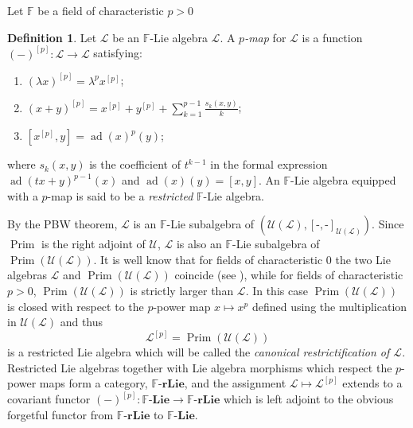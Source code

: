 \documentclass{amsart}
\theoremstyle{plain}
\theoremstyle{definition}
\newtheorem{defn}{Definition}
\numberwithin{theorem}{section}
\numberwithin{equation}{section}
\newcommand{\LL}{\mathscr{L}}
\newcommand{\Univ}{\mathscr{U}}
\newcommand{\Prim}{\operatorname{Prim}}
\newcommand{\ad}{\operatorname{ad}}
\newcommand{\catlie}{\mathbf{Lie}}
\newcommand{\catReslie}{\mathbf{rLie}}
\newcommand{\FF}{\mathbb{F}}
\begin{document}
Let $\FF$ be a field of characteristic $p > 0$
\begin{defn}\label{def:restricted.lie.alg}
    Let $\LL$ be an $\FF$-Lie algebra $\LL$. A \emph{$p$-map} for $\LL$ is a function $(-)^{[p]} : \LL \to \LL$ satisfying:
    \begin{enumerate}
        \item[($\rm rL_1$)] $(\lambda x)^{[p]} = \lambda^p x^{[p]}$;
        \item[($\rm rL_2$)] $(x + y)^{[p]} = x^{[p]} + y^{[p]} + \sum_{k=1}^{p-1} \frac{s_k(x, y)}{k}$;
        \item[($\rm rL_3$)] $[x^{[p]}, y] = \ad(x)^p(y)$;
    \end{enumerate}
    where $s_k(x, y)$ is the coefficient of $t^{k-1}$ in the formal expression $\ad(tx+y)^{p-1}(x)$ and $\ad(x)(y) = [x, y]$. An $\FF$-Lie algebra equipped with a $p$-map is said to be a \emph{restricted} $\FF$-Lie algebra.
\end{defn}

By the PBW theorem, $\LL$ %
is an $\FF$-Lie subalgebra of $(\Univ(\LL), [\text{-},\text{-}]_{\Univ(\LL)})$. Since $\Prim$ is the right adjoint of $\Univ$, $\LL$ is also an $\FF$-Lie subalgebra of $\Prim(\Univ(\LL))$. It is well know that for fields of characteristic $0$ the two Lie algebras $\LL$ and $\Prim(\Univ(\LL))$ coincide (see \cite{Bou89} \cite{MM65}), while for fields of characteristic $p > 0$, $\Prim(\Univ(\LL))$ is strictly larger than $\LL$.
In this case $\Prim(\Univ(\LL))$ is closed with respect to the $p$-power map $x \mapsto x^p$ defined using the multiplication in $\Univ(\LL)$ and thus \begin{equation}
    \LL^{[p]} = \Prim(\Univ(\LL))
\end{equation}
is a restricted Lie algebra which will be called the  \emph{canonical restrictification of $\LL$}.
\noindent
Restricted Lie algebras together with Lie algebra morphisms which respect the $p$-power maps form a category, $\FF\text{-}\catReslie$, and the assignment $\LL \mapsto \LL^{[p]}$ extends to a covariant functor $(-)^{[p]} : \FF\text{-}\catlie \to \FF\text{-}\catReslie$ which is left adjoint to the obvious forgetful functor from $\FF\text{-}\catReslie$ to $\FF\text{-}\catlie$.
\end{document}
